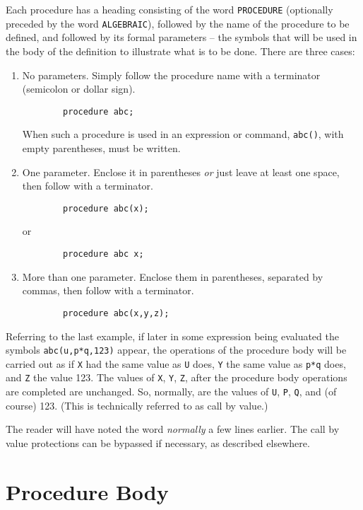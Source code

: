 Each procedure has a heading consisting of the word {\tt PROCEDURE}
(optionally preceded by the word {\tt ALGEBRAIC}), followed by the name of
the procedure to be defined, and followed by its formal parameters -- the
symbols that will be used in the body of the definition to illustrate
what is to be done.  There are three cases:
\begin{enumerate}
\item No parameters. Simply follow the procedure name with a terminator
(semicolon or dollar sign).
\begin{verbatim}
        procedure abc;
\end{verbatim}

When such a procedure is used in an expression or command, {\tt abc()}, with
empty parentheses, must be written.

\item One parameter.  Enclose it in parentheses {\em or\/} just leave at
least one space, then follow with a terminator.
\begin{verbatim}
        procedure abc(x);
\end{verbatim}
or
\begin{verbatim}
        procedure abc x;
\end{verbatim}

\item More than one parameter. Enclose them in parentheses, separated by
commas, then follow with a terminator.
\begin{verbatim}
        procedure abc(x,y,z);
\end{verbatim}
\end{enumerate}
Referring to the last example, if later in some expression being evaluated
the symbols {\tt abc(u,p*q,123)} appear, the operations of the procedure
body will be carried out as if {\tt X} had the same value as {\tt U} does,
{\tt Y} the same value as {\tt p*q} does, and {\tt Z} the value 123.  The
values of {\tt X}, {\tt Y}, {\tt Z}, after the procedure body operations
are completed are unchanged.  So, normally, are the values of {\tt U},
{\tt P}, {\tt Q}, and (of course) 123. (This is technically referred to as
call by value.)

The reader will have noted the word {\em normally\/} a few lines earlier. The
call by value protections can be bypassed if necessary, as described
elsewhere.

\section{Procedure Body}

